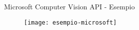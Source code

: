 %
\begin{frame}[t]{Microsoft Computer Vision API - Esempio}
	\begin{figure}[h]
	\centering
	    \texttt{[image: esempio-microsoft]}
		\label{webidOverview}
	\end{figure}
\end{frame}
%
